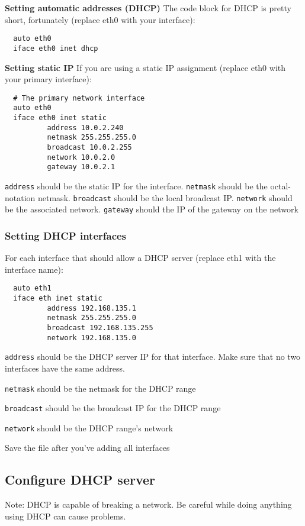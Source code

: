 \documentclass{article}
\begin{document}
\begin{flushleft}
\textbf{Setting automatic addresses (DHCP)}
The code block for DHCP is pretty short, fortunately (replace eth0 with your interface):
\begin{verbatim}
  auto eth0
  iface eth0 inet dhcp
\end{verbatim}

\textbf{Setting static IP}
If you are using a static IP assignment (replace eth0 with your primary interface):
\begin{verbatim}
  # The primary network interface
  auto eth0
  iface eth0 inet static
          address 10.0.2.240
          netmask 255.255.255.0
          broadcast 10.0.2.255
          network 10.0.2.0
          gateway 10.0.2.1
\end{verbatim}

\verb|address| should be the static IP for the interface.
\verb|netmask| should be the octal-notation netmask.
\verb|broadcast| should be the local broadcast IP.
\verb|network| should be the associated network.
\verb|gateway| should the IP of the gateway on the network

\subsubsection{Setting DHCP interfaces}
For each interface that should allow a DHCP server (replace eth1 with the interface name):

\begin{verbatim}
  auto eth1
  iface eth inet static
          address 192.168.135.1
          netmask 255.255.255.0
          broadcast 192.168.135.255
          network 192.168.135.0
\end{verbatim}

\verb|address| should be the DHCP server IP for that interface.  Make sure that no two interfaces have the same address.

\verb|netmask| should be the netmask for the DHCP range

\verb|broadcast| should be the broadcast IP for the DHCP range

\verb|network| should be the DHCP range's network

Save the file after you've adding all interfaces
\subsection{Configure DHCP server}
Note: DHCP is capable of breaking a network.  Be careful while doing anything using DHCP can cause problems.


\end{flushleft}
\end{document}

